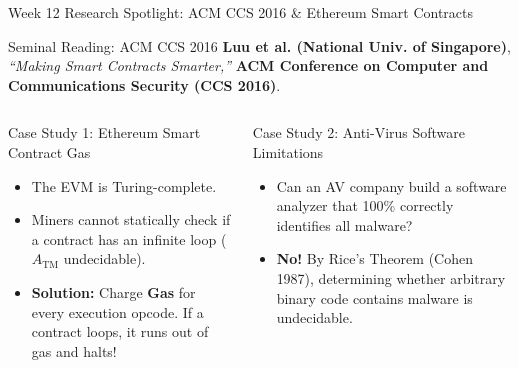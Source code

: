 \documentclass[aspectratio=169,10pt]{beamer}
\begin{document}
\begin{frame}{Week 12 Research Spotlight: ACM CCS 2016 \& Ethereum Smart Contracts}
    \begin{exampleblock}{Seminal Reading: ACM CCS 2016}
        \textbf{Luu et al. (National Univ. of Singapore)}, \textit{``Making Smart Contracts Smarter,''} \textbf{ACM Conference on Computer and Communications Security (CCS 2016)}.
    \end{exampleblock}
    
    \begin{columns}[T]
        \begin{block}{Case Study 1: Ethereum Smart Contract Gas}
            \begin{itemize}
                \item The EVM is Turing-complete.
                \item Miners cannot statically check if a contract has an infinite loop ($A_{\text{TM}}$ undecidable).
                \item \textbf{Solution:} Charge \textbf{Gas} for every execution opcode. If a contract loops, it runs out of gas and halts!
            \end{itemize}
        \end{block}
        
        \begin{alertblock}{Case Study 2: Anti-Virus Software Limitations}
            \begin{itemize}
                \item Can an AV company build a software analyzer that 100\% correctly identifies all malware?
                \item \textbf{No!} By Rice's Theorem (Cohen 1987), determining whether arbitrary binary code contains malware is undecidable.
            \end{itemize}
        \end{alertblock}
    \end{columns}
\end{frame}
\end{document}
